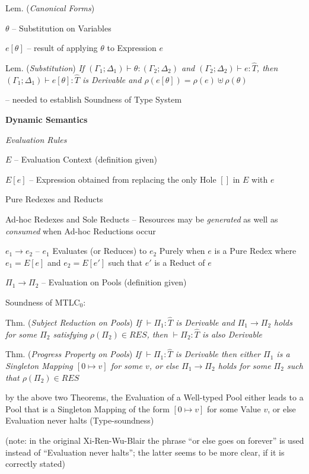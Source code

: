 Lem. (\emph{Canonical Forms})

$\theta$ -- Substitution on Variables

$e[\theta]$ -- result of applying $\theta$ to Expression $e$

Lem. (\emph{Substitution}) \emph{If $(\Gamma_1;\Delta_1) \vdash \theta
  : (\Gamma_2;\Delta_2)$ and $(\Gamma_2;\Delta_2) \vdash e : \hat{T}$,
  then $(\Gamma_1;\Delta_1) \vdash e[\theta] : \hat{T}$ is Derivable
  and $\rho(e[\theta]) = \rho(e) \uplus \rho(\theta)$}

-- needed to establish Soundness of Type System


\textbf{Dynamic Semantics}

\emph{Evaluation Rules}

$E$ -- Evaluation Context (definition given)

$E[e]$ -- Expression obtained from replacing the only Hole $[]$ in $E$
with $e$

Pure Redexes and Reducts

Ad-hoc Redexes and Sole Reducts -- Resources may be \emph{generated}
as well as \emph{consumed} when Ad-hoc Reductions occur

$e_1 \rightarrow e_2$ -- $e_1$ Evaluates (or Reduces) to $e_2$ Purely
when $e$ is a Pure Redex where $e_1 = E[e]$ and $e_2 = E[e']$ such
that $e'$ is a Reduct of $e$

$\Pi_1 \rightarrow \Pi_2$ -- Evaluation on Pools (definition given)

Soundness of MTLC$_0$:

Thm. (\emph{Subject Reduction on Pools}) \emph{If $\vdash \Pi_1 :
  \hat{T}$ is Derivable and $\Pi_1 \rightarrow \Pi_2$ holds for some
  $\Pi_2$ satisfying $\rho(\Pi_2) \in RES$, then $\vdash \Pi_2 :
  \hat{T}$ is also Derivable}

Thm. (\emph{Progress Property on Pools}) \emph{If $\vdash\Pi_1 :
  \hat{T}$ is Derivable then either $\Pi_1$ is a Singleton Mapping $[0
    \mapsto v]$ for some $v$, or else $\Pi_1 \rightarrow \Pi_2$ holds
  for some $\Pi_2$ such that $\rho(\Pi_2) \in RES$}

by the above two Theorems, the Evaluation of a Well-typed Pool either
leads to a Pool that is a Singleton Mapping of the form $[0 \mapsto
  v]$ for some Value $v$, or else Evaluation never halts
(Type-soundness)

(note: in the original Xi-Ren-Wu-Blair the phrase ``or else goes on
forever'' is used instead of ``Evaluation never halts''; the latter
seems to be more clear, if it is correctly stated)



